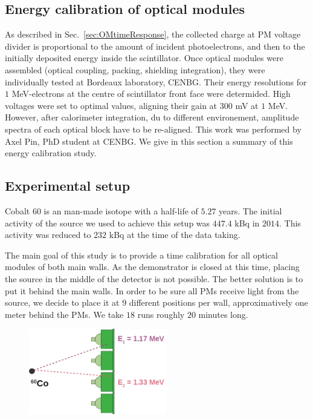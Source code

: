 
\subsection{Energy calibration of optical modules}
\label{subsec:OMenergyCalib}

As described in Sec.~\ref{sec:OMtimeResponse}, the collected charge at PM voltage divider is proportional to the amount of incident photoelectrons, and then to the initially deposited energy inside the scintillator.
Once optical modules were assembled (optical coupling, packing, shielding integration), they were individually tested at Bordeaux laboratory, CENBG.
Their energy resolutions for $1$ MeV-electrons at the centre of scintillator front face were determided.
High voltages were set to optimal values, aligning their gain at $300$ mV at $1$ MeV.
However, after calorimeter integration, du to different environement, amplitude spectra of each optical block have to be re-aligned.
This work was performed by Axel Pin, PhD student at CENBG.
We give in this section a summary of this energy calibration study.



\subsection{Experimental setup}

Cobalt $60$ is an man-made isotope with a half-life of $5.27$ years.
The initial activity of the source we used to achieve this setup was $447.4$ kBq in $2014$.
This activity was reduced to $232$ kBq at the time of the data taking.

The main goal of this study is to provide a time calibration for all optical modules of both main walls.
As the demonstrator is closed at this time, placing the source in the middle of the detector is not possible.
The better solution is to put it behind the main walls.
In order to be sure all PMs receive light from the source, we decide to place it at $9$ different positions per wall, approximatively one meter behind the PMs.
We take $18$ runs roughly $20$ minutes long.


\begin{figure}[h]
  \centering
  \includegraphics[width=6cm]{commissioning/fig_commissioning/Co_setup.pdf}
  \caption{
\label{fig:}}
\end{figure}

